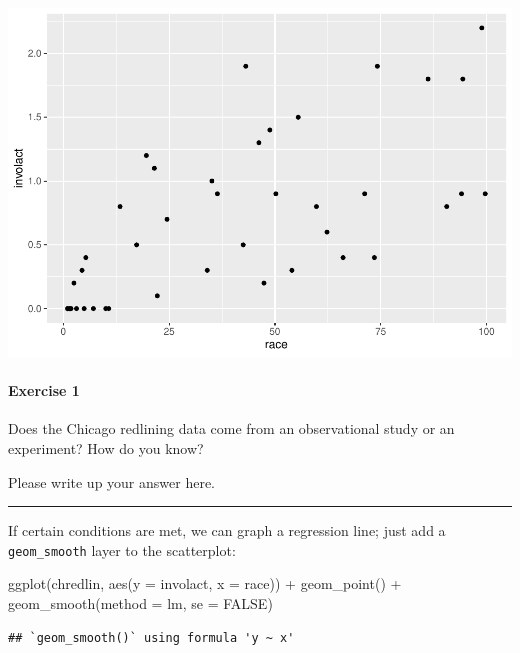 \documentclass[
]{book}
\newenvironment{Shaded}{\begin{snugshade}}{\end{snugshade}}
\newcommand{\AttributeTok}[1]{\textcolor[rgb]{0.77,0.63,0.00}{#1}}
\newcommand{\ConstantTok}[1]{\textcolor[rgb]{0.00,0.00,0.00}{#1}}
\newcommand{\FunctionTok}[1]{\textcolor[rgb]{0.00,0.00,0.00}{#1}}
\newcommand{\NormalTok}[1]{#1}
\newcommand{\SpecialCharTok}[1]{\textcolor[rgb]{0.00,0.00,0.00}{#1}}
\begin{document}
\includegraphics{intro_stats_files/figure-latex/unnamed-chunk-177-1.pdf}

\hypertarget{exercise-1-4}{%
\paragraph*{Exercise 1}\label{exercise-1-4}}

Does the Chicago redlining data come from an observational study or an experiment? How do you know?

Please write up your answer here.

\begin{center}\rule{0.5\linewidth}{0.5pt}\end{center}

If certain conditions are met, we can graph a regression line; just add a \texttt{geom\_smooth} layer to the scatterplot:

\begin{Shaded}
\begin{Highlighting}[]
\FunctionTok{ggplot}\NormalTok{(chredlin, }\FunctionTok{aes}\NormalTok{(}\AttributeTok{y =}\NormalTok{ involact, }\AttributeTok{x =}\NormalTok{ race)) }\SpecialCharTok{+}
    \FunctionTok{geom\_point}\NormalTok{() }\SpecialCharTok{+}
    \FunctionTok{geom\_smooth}\NormalTok{(}\AttributeTok{method =}\NormalTok{ lm, }\AttributeTok{se =} \ConstantTok{FALSE}\NormalTok{)}
\end{Highlighting}
\end{Shaded}

\begin{verbatim}
## `geom_smooth()` using formula 'y ~ x'
\end{verbatim}
\end{document}
